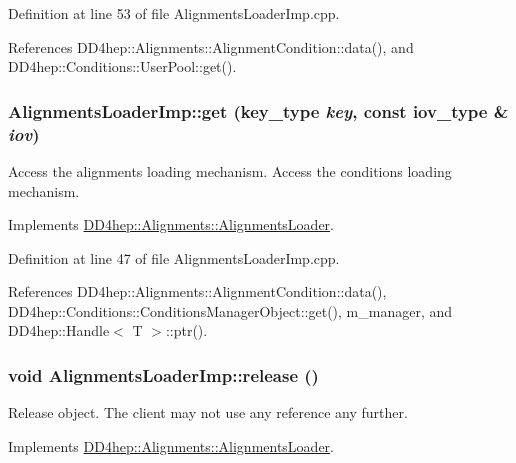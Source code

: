 Definition at line 53 of file AlignmentsLoaderImp.cpp.

References DD4hep::Alignments::AlignmentCondition::data(), and DD4hep::Conditions::UserPool::get().\hypertarget{class_d_d4hep_1_1_conditions_1_1_alignments_loader_imp_af6db86883e1ab8af6940e3260369228d}{
\subsubsection[{get}]{ AlignmentsLoaderImp::get ({\bf key\_\-type} {\em key}, \/  const {\bf iov\_\-type} \& {\em iov})}}
\label{class_d_d4hep_1_1_conditions_1_1_alignments_loader_imp_af6db86883e1ab8af6940e3260369228d}


Access the alignments loading mechanism. Access the conditions loading mechanism. 

Implements \hyperlink{class_d_d4hep_1_1_alignments_1_1_alignments_loader_a26866df09d8670f134fc0895444f1675}{DD4hep::Alignments::AlignmentsLoader}.

Definition at line 47 of file AlignmentsLoaderImp.cpp.

References DD4hep::Alignments::AlignmentCondition::data(), DD4hep::Conditions::ConditionsManagerObject::get(), m\_\-manager, and DD4hep::Handle$<$ T $>$::ptr().\hypertarget{class_d_d4hep_1_1_conditions_1_1_alignments_loader_imp_aa9cf749689a76b853f7d7e543f84b761}{
\subsubsection[{release}]{\setlength{\rightskip}{0pt plus 5cm}void AlignmentsLoaderImp::release ()}}
\label{class_d_d4hep_1_1_conditions_1_1_alignments_loader_imp_aa9cf749689a76b853f7d7e543f84b761}


Release object. The client may not use any reference any further. 

Implements \hyperlink{class_d_d4hep_1_1_alignments_1_1_alignments_loader_acebda57b7dc5288116e7162dda92b65e}{DD4hep::Alignments::AlignmentsLoader}.

